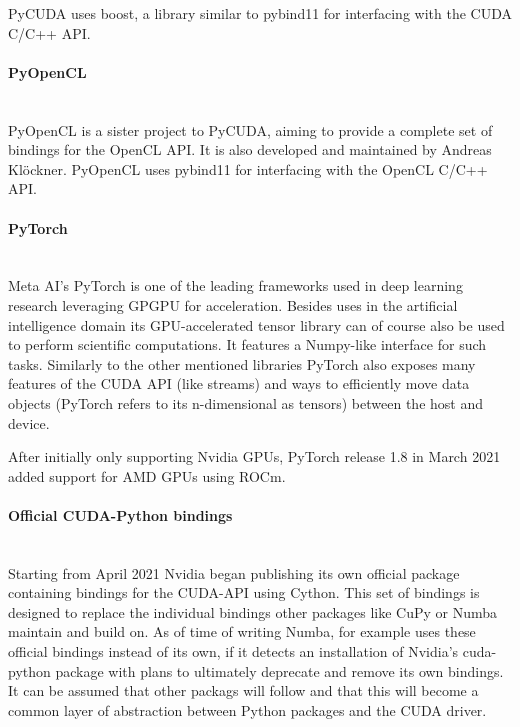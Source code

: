 \documentclass[english,11pt,a4paper,table]{article} %
\begin{document}
PyCUDA uses boost, a library similar to pybind11 for interfacing with the CUDA C/C++ API.

\paragraph*{PyOpenCL}\mbox{}\\
PyOpenCL \cite{kloeckner_pycuda_2012} is a sister project to PyCUDA, aiming to provide a complete set of bindings for the OpenCL API.
It is also developed and maintained by Andreas Klöckner.
PyOpenCL uses pybind11 for interfacing with the OpenCL C/C++ API.


\paragraph*{PyTorch}\mbox{}\\

Meta AI's PyTorch \cite{NEURIPS2019_9015} is one of the leading frameworks used in deep learning research leveraging GPGPU for acceleration.
Besides uses in the artificial intelligence domain its GPU-accelerated tensor library can of course also be used to perform scientific computations.
It features a Numpy-like interface for such tasks.
Similarly to the other mentioned libraries PyTorch also exposes many features of the CUDA API (like streams) and ways to efficiently move data objects (PyTorch refers to its n-dimensional as tensors) between the host and device.

After initially only supporting Nvidia GPUs, PyTorch release 1.8 in March 2021 added support for AMD GPUs using ROCm.

\paragraph*{Official CUDA-Python bindings}\mbox{}\\

Starting from April 2021 \cite*{Unifying91:online} Nvidia began publishing its own official package \cite{CUDAPyth5:online} containing bindings for the CUDA-API using Cython.
This set of bindings is designed to replace the individual bindings other packages like CuPy or Numba maintain and build on.
As of time of writing Numba, for example uses these official bindings instead of its own, if it detects an installation of Nvidia's cuda-python package with plans to ultimately deprecate and remove its own bindings.
It can be assumed that other packags will follow and that this will become a common layer of abstraction between Python packages and the CUDA driver.
\end{document}
